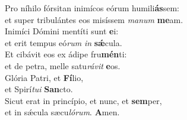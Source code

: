 \oddverse Pro níhilo fórsitan inimícos eórum humili\textbf{ás}sem:~\*\\
\oddverse et super tribulántes eos misíssem \textit{ma}\textit{num} \textbf{me}am.\\
\evenverse Inimíci Dómini mentíti sunt \textbf{e}i:~\*\\
\evenverse et erit tempus eó\textit{rum} \textit{in} \textbf{sǽ}cula.\\
\oddverse Et cibávit eos ex ádipe fru\textbf{mén}ti:~\*\\
\oddverse et de petra, melle satu\textit{rá}\textit{vit} \textbf{e}os.\\
\evenverse Glória Patri, et \textbf{Fí}lio,~\*\\
\evenverse et Spirí\textit{tu}\textit{i} \textbf{San}cto.\\
\oddverse Sicut erat in princípio, et nunc, et \textbf{sem}per,~\*\\
\oddverse et in sǽcula sæcu\textit{ló}\textit{rum}. \textbf{A}men.\\
